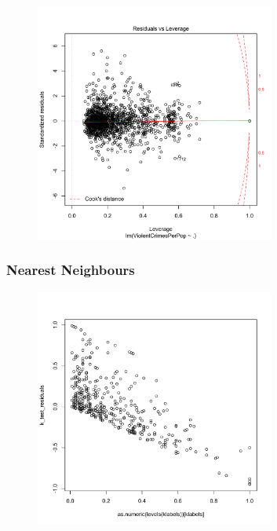 \documentclass[12pt,a4paper]{article}
\begin{document}
\begin{singlespace}
\vspace{-0.5cm}
\begin{figure}[h!]
    \centering
    \includegraphics[width=0.7\textwidth,trim= 0 0 20 30, clip]{Unk_linear_regression_cook.pdf}
\end{figure}
\FloatBarrier

\newpage
\subsubsection{Nearest Neighbours}
\vspace{-0.5cm}
\begin{figure}[h!]
    \centering
    \includegraphics[width=0.7\textwidth,trim= 0 0 20 30, clip]{Unk_NN_regression_residuals.pdf}
\end{figure}
\FloatBarrier


\end{singlespace}
\end{document}
